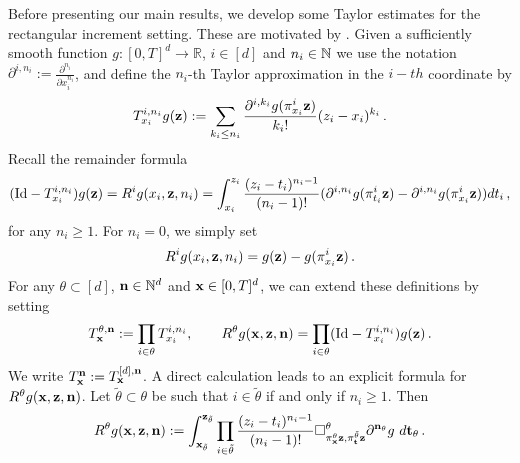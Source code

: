 \documentclass[12pt]{article}
\numberwithin{equation}{section}
\theoremstyle{plain}
\theoremstyle{definition}
\newcommand{\Id}{\mbox{Id}}
\def\bR{\mathbb{R}}\def\bS{\mathbb{S}}
\begin{document}
Before presenting our main results, we develop some Taylor estimates for the rectangular increment setting. These are motivated by \cite[Example 4.1]{zambotti2020}. Given a sufficiently smooth function $g:[0,T]^d\to\bR$, $i\in[d]$ and $n_i\in\mathbb{N}$ we use the notation $\partial^{i,n_i} := \frac{\partial^{n_i}}{\partial x_i^{n_i}}$, and define the $n_i$-th Taylor approximation in the $i-th$ coordinate by
\[
    T^{i,n_i}_{x_i} g(\mathbf z) := \sum_{k_i\le n_i}\frac{\partial^{i,k_i} g(\pi^i_{x_i}\mathbf z)}{k_i!} (z_i-x_i)^{k_i}\,.
\]
Recall the remainder formula
\[
    (\Id-T^{i,n_i}_{x_i}) g(\fz) = R^ig(x_i,\fz,n_i) = \int_{x_i}^{z_i} \frac{(z_i-t_i)^{n_i-1}}{(n_i-1)!} (\partial^{i,n_i} g(\pi^i_{t_i}\fz)- \partial^{i,n_i} g(\pi^i_{x_i}\fz)) dt_i\,,
\]
for any $n_i\ge 1$. For $n_i=0$, we simply set
\[
    R^ig(x_i,\mathbf z,n_i) = g(\mathbf z)-g(\pi^i_{x_i}\mathbf z)\,.
\]
For any $\theta\subset[d]$, $\mathbf n\in\mathbb{N}^d$ and $\mathbf x\in[0,T]^d$, we can extend these definitions by setting
\[
    T^{\theta,\fn}_\fx := \prod_{i\in\theta} T^{i,n_i}_{x_i},\qquad R^\theta g(\fx,\fz,\fn) = \prod_{i\in\theta} (\Id-T^{i,n_i}_{x_i})g(\fz)\,.
\]
We write $T^\mathbf n_\mathbf x := T^{[d],\mathbf n}_\mathbf x$. A direct calculation leads to an explicit formula for $R^\theta g(\mathbf x,\mathbf z,\mathbf n)$. Let $\tilde\theta\subset\theta$ be such that $i\in\tilde\theta$ if and only if $n_i\ge 1$. Then
\begin{equation}\label{def:remainderTaylorRegIncrement}
R^\theta g(\fx,\fz,\fn) := \int_{\fx_{\tilde\theta}}^{\fz_{\tilde\theta}} \prod_{i\in\tilde\theta} \frac{(z_i-t_i)^{n_i-1}}{(n_i-1)!} \square_{\pi^\theta_\fx\fz,\pi_\ft^{\tilde\theta}\fz}^\theta \partial^{\fn_\theta} g ~d\ft_\theta\,.
\end{equation}
\end{document}
